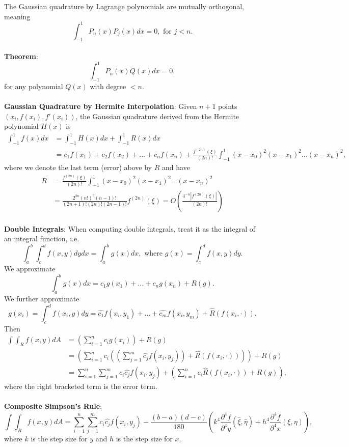 \documentclass{article}
\begin{document}
The Gaussian quadrature by Lagrange polynomials are mutually orthogonal, meaning $$\int_{-1}^1 P_n(x) P_j(x)dx = 0, \text{ for } j < n.$$ \\
\textbf{Theorem}: $$\int_{-1}^1 P_n(x) Q(x)dx = 0,$$ for any polynomial $Q(x)$ with degree $< n$. \\ \\
\textbf{Gaussian Quadrature by Hermite Interpolation}: Given $n + 1$ points $(x_i, f(x_i), f'(x_i))$, the Gaussian quadrature derived from the Hermite polynomial $H(x)$ is \begin{align*}
    \int_{-1}^1 f(x)dx &= \int_{-1}^1 H(x)dx + \int_{-1}^1 R(x)dx \\
    &= c_1 f(x_1) + c_2 f(x_2) + \dots + c_n f(x_n) + \frac{f^{(2n)} (\xi)}{(2n)!} \int_{-1}^1 (x - x_0)^2 (x - x_1)^2 \dots (x - x_n)^2,
\end{align*} where we denote the last term (error) above by $R$ and have \begin{align*}
    R &= \frac{f^{(2n)} (\xi)}{(2n)!} \int_{-1}^1 (x - x_0)^2 (x - x_1)^2 \dots (x - x_n)^2 \\
    &= \frac{2^{2n} (n!)^3 (n - 1)!}{(2n + 1)! (2n)! (2n - 1)!}f^{(2n)}(\xi) = O \left( \frac{4^{-n} |f^{(2n)} (\xi)|}{(2n)!} \right)
\end{align*} \\
\textbf{Double Integrals}: When computing double integrals, treat it as the integral of an integral function, i.e. $$\int_a^b \int_c^d f(x, y) dydx = \int_a^b g(x)dx, \text{ where } g(x) = \int_c^d f(x, y) dy.$$ We approximate $$\int_a^b g(x)dx = c_1 g(x_1) + \dots + c_n g(x_n) + R(g).$$ We further approximate $$g(x_i) = \int_c^d f(x_i, y) dy = \widehat{c_1}f(x_i, y_1) + \dots + \widehat{c_m}f(x_i, y_m) + \widehat{R}(f(x_i, \cdot)).$$ Then \begin{align*}
    \int \int_R f(x, y) dA &= \left( \sum_{i = 1}^n c_i g(x_i) \right) + R(g) \\
    &= \left( \sum_{i = 1}^n c_i \left( \left( \sum_{j = 1}^m \widehat{c_j} f(x_i, y_j) \right) + \widehat{R}(f(x_i, \cdot)) \right) \right) + R(g) \\
    &= \sum_{i = 1}^n \sum_{j = 1}^m c_i \widehat{c_j} f(x_i, y_j) + \left( \sum_{i = 1}^n c_i \widehat{R}(f(x_i, \cdot)) + R(g) \right),
\end{align*} where the right bracketed term is the error term. \\ \\
\textbf{Composite Simpson's Rule}: $$\int \int_R f(x, y) dA = \sum_{i = 1}^n \sum_{j = 1}^m c_i \widehat{c_j} f(x_i, y_j) - \frac{(b - a)(d - c)}{180} \left( k^4 \frac{\partial^4 f}{\partial^4 y}(\widehat{\xi}, \widehat{\eta}) +  h^4 \frac{\partial^4 f}{\partial^4 x}(\xi, \eta)\right),$$ where $k$ is the step size for $y$ and $h$ is the step size for $x$. \\ \\
\end{document}

